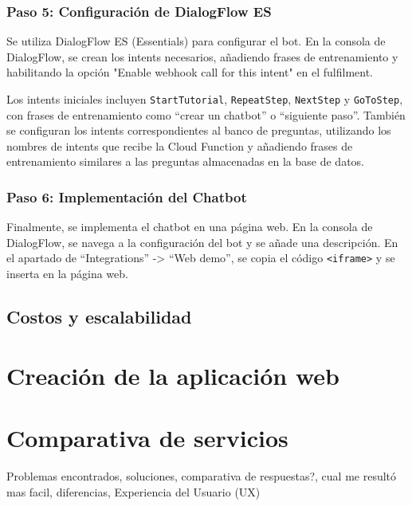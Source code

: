 \subsubsection{Paso 5: Configuración de DialogFlow ES}
Se utiliza DialogFlow ES (Essentials) para configurar el bot. En la consola de DialogFlow, se crean los intents necesarios, añadiendo frases de entrenamiento y habilitando la opción "Enable webhook call for this intent" en el fulfilment.

Los intents iniciales incluyen \texttt{StartTutorial}, \texttt{RepeatStep}, \texttt{NextStep} y \texttt{GoToStep}, con frases de entrenamiento como “crear un chatbot” o “siguiente paso”. También se configuran los intents correspondientes al banco de preguntas, utilizando los nombres de intents que recibe la Cloud Function y añadiendo frases de entrenamiento similares a las preguntas almacenadas en la base de datos.

\subsubsection{Paso 6: Implementación del Chatbot}
Finalmente, se implementa el chatbot en una página web. En la consola de DialogFlow, se navega a la configuración del bot y se añade una descripción. En el apartado de “Integrations” -> “Web demo”, se copia el código \texttt{<iframe>} y se inserta en la página web.

\subsection{Costos y escalabilidad}\label{costos-gcp}


\section{Creación de la aplicación web}\label{webapp}

\section{Comparativa de servicios}\label{comparativa}
Problemas encontrados, soluciones, comparativa de respuestas?, cual me resultó mas facil, diferencias, Experiencia del Usuario (UX)
